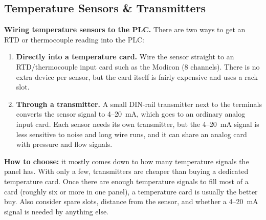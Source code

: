 \subsection{Temperature Sensors \& Transmitters}\label{sec:temperature}
\textbf{Wiring temperature sensors to the PLC.} There are two ways to get an RTD or thermocouple reading into the PLC:
\begin{enumerate}[itemsep=2pt]
  \item \textbf{Directly into a temperature card.} Wire the sensor straight to an RTD/thermocouple input card such as the Modicon  (8 channels). There is no extra device per sensor, but the card itself is fairly expensive and uses a rack slot.
  \item \textbf{Through a transmitter.} A small DIN-rail transmitter next to the terminals converts the sensor signal to 4--20~mA, which goes to an ordinary analog input card. Each sensor needs its own transmitter, but the 4--20~mA signal is less sensitive to noise and long wire runs, and it can share an analog card with pressure and flow signals.
\end{enumerate}
\textbf{How to choose:} it mostly comes down to how many temperature signals the panel has. With only a few, transmitters are cheaper than buying a dedicated temperature card. Once there are enough temperature signals to fill most of a card (roughly six or more in one panel), a temperature card is usually the better buy. Also consider spare slots, distance from the sensor, and whether a 4--20~mA signal is needed by anything else.


